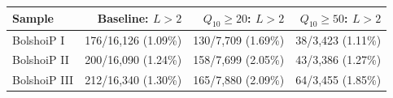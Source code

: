 \begin{tabular}{lrrr}
\toprule
Sample & Baseline: $L>2$ & $Q_{10}\geq20$: $L>2$ & $Q_{10}\geq50$: $L>2$ \\
\midrule
BolshoiP I & 176/16,126 (1.09\%) & 130/7,709 (1.69\%) & 38/3,423 (1.11\%) \\
BolshoiP II & 200/16,090 (1.24\%) & 158/7,699 (2.05\%) & 43/3,386 (1.27\%) \\
BolshoiP III & 212/16,340 (1.30\%) & 165/7,880 (2.09\%) & 64/3,455 (1.85\%) \\
\bottomrule
\end{tabular}
